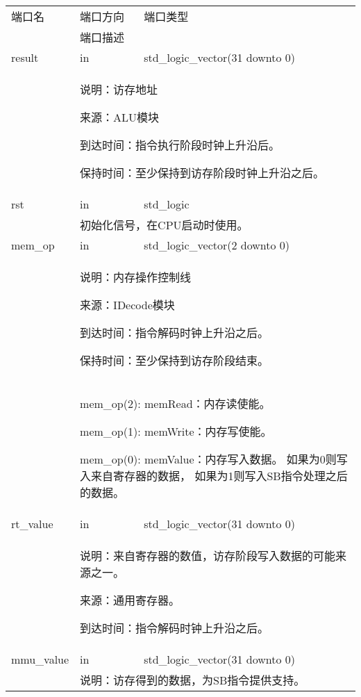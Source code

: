         \begin{tabularx}{\textwidth}{lll}
            \toprule
            端口名      & 端口方向  & 端口类型 \\
            \cmidrule(l){2-3}
            &
            \multicolumn{2}{X}{端口描述} \\
            \midrule
            result      & in   & std\_logic\_vector(31 downto 0) \\
            \cmidrule(l){2-3}
            &
            \multicolumn{2}{X}{
                说明：访存地址

                来源：ALU模块

                到达时间：指令执行阶段时钟上升沿后。

                保持时间：至少保持到访存阶段时钟上升沿之后。
            } \\
            \midrule
            rst      & in    & std\_logic \\
            \cmidrule(l){2-3}
            &
            \multicolumn{2}{X}{
                初始化信号，在CPU启动时使用。
            } \\
            \midrule
            mem\_op      & in    & std\_logic\_vector(2 downto 0) \\
            \cmidrule(l){2-3}
            &
            \multicolumn{2}{X}{
                说明：内存操作控制线

                来源：IDecode模块
                
                到达时间：指令解码时钟上升沿之后。

                保持时间：至少保持到访存阶段结束。
            } \\
            &
            \multicolumn{2}{X}{
                mem\_op(2): memRead：内存读使能。

                mem\_op(1): memWrite：内存写使能。

                mem\_op(0): memValue：内存写入数据。
                如果为0则写入来自寄存器的数据，%
                如果为1则写入SB指令处理之后的数据。
            } \\
            \midrule
            rt\_value   & in    & std\_logic\_vector(31 downto 0) \\
            \cmidrule(l){2-3}
            &
            \multicolumn{2}{X}{
                说明：来自寄存器的数值，访存阶段写入数据的可能来源之一。

                来源：通用寄存器。

                到达时间：指令解码时钟上升沿之后。
            } \\
            \midrule
            mmu\_value  & in    & std\_logic\_vector(31 downto 0) \\
            \cmidrule(l){2-3}
            &
            \multicolumn{2}{X}{
                说明：访存得到的数据，为SB指令提供支持。

}
\end{tabularx}
